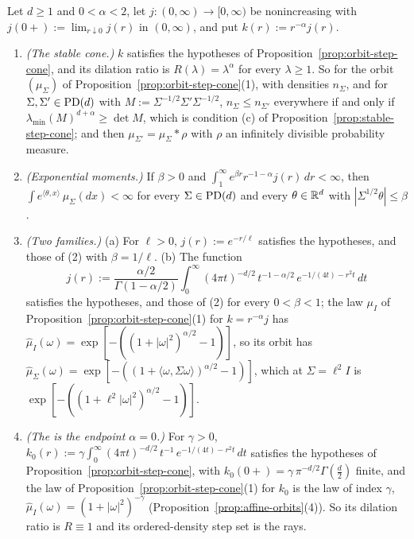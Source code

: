 \begin{proposition}\label{prop:tempered-step-cone}
Let $d \ge 1$ and $0 < \alpha < 2$, let $j : (0,\infty) \to [0,\infty)$ be nonincreasing with
$j(0{+}) := \lim_{r\downarrow0}j(r)$ in $(0,\infty)$, and put $k(r) := r^{-\alpha}j(r)$.
\begin{enumerate}
\item \emph{(The stable cone.)} $k$ satisfies the hypotheses of Proposition~\ref{prop:orbit-step-cone}, and its
dilation ratio is $R(\lambda) = \lambda^\alpha$ for every $\lambda \ge 1$. So for the orbit
$(\mu_\Sigma)$ of Proposition~\ref{prop:orbit-step-cone}(1), with \Levy{} densities $n_\Sigma$, and for
$\Sigma, \Sigma' \in \mathrm{PD}(d)$ with $M := \Sigma^{-1/2}\Sigma'\Sigma^{-1/2}$, $n_\Sigma \le n_{\Sigma'}$
everywhere if and only if $\lambda_{\min}(M)^{d+\alpha} \ge \det M$, which is condition (c) of
Proposition~\ref{prop:stable-step-cone}; and then $\mu_{\Sigma'} = \mu_\Sigma * \rho$ with $\rho$ an infinitely
divisible probability measure.
\item \emph{(Exponential moments.)} If $\beta > 0$ and
$\int_1^\infty e^{\beta r}r^{-1-\alpha}j(r)\,dr < \infty$, then
$\int e^{\langle\theta,x\rangle}\,\mu_\Sigma(dx) < \infty$ for every $\Sigma \in \mathrm{PD}(d)$ and every
$\theta \in \mathbb{R}^d$ with $|\Sigma^{1/2}\theta| \le \beta$.
\item \emph{(Two families.)} (a) For $\ell > 0$, $j(r) := e^{-r/\ell}$ satisfies the hypotheses, and
those of (2) with $\beta = 1/\ell$. (b) The function
\[
  j(r) := \frac{\alpha/2}{\Gamma(1-\alpha/2)}\int_0^\infty(4\pi t)^{-d/2}\,t^{-1-\alpha/2}\,
  e^{-1/(4t) - r^2t}\,dt
\]
satisfies the hypotheses, and those of (2) for every $0 < \beta < 1$; the law $\mu_I$ of
Proposition~\ref{prop:orbit-step-cone}(1) for $k = r^{-\alpha}j$ has
$\widehat\mu_I(\omega) = \exp[-((1 + |\omega|^2)^{\alpha/2} - 1)]$, so its orbit has
$\widehat\mu_\Sigma(\omega) = \exp[-((1 + \langle\omega,\Sigma\omega\rangle)^{\alpha/2} - 1)]$, which
at $\Sigma = \ell^2I$ is $\exp[-((1 + \ell^2|\omega|^2)^{\alpha/2} - 1)]$.
\item \emph{(The \Matern{} is the endpoint $\alpha = 0$.)} For $\gamma > 0$,
$k_0(r) := \gamma\int_0^\infty(4\pi t)^{-d/2}\,t^{-1}\,e^{-1/(4t) - r^2t}\,dt$ satisfies the
hypotheses of Proposition~\ref{prop:orbit-step-cone}, with $k_0(0{+}) = \gamma\,\pi^{-d/2}\Gamma(\tfrac d2)$
finite, and the law of Proposition~\ref{prop:orbit-step-cone}(1) for $k_0$ is the \Matern{} law of index
$\gamma$, $\widehat\mu_I(\omega) = (1 + |\omega|^2)^{-\gamma}$ (Proposition~\ref{prop:affine-orbits}(4)). So its
dilation ratio is $R \equiv 1$ and its ordered-density step set is the rays.
\end{enumerate}
\end{proposition}

